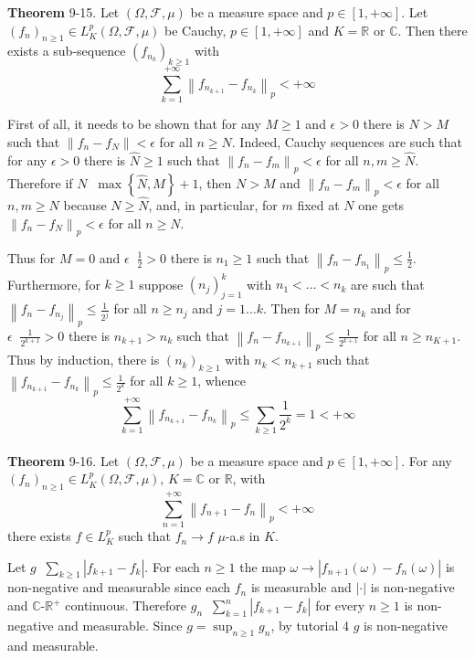 \documentclass[a4paper]{article}
\newcommand{\obj}[1]{\left\{ #1 \right \}}
\newcommand{\clo}[1]{\left [ #1 \right ]}
\newcommand{\brac}[1]{\left ( #1 \right )}
\newcommand{\abs}[1]{\left | #1 \right |}
\newcommand{\nrm}[1]{\left\| #1 \right \|}
\newcommand{\Real}{\mathbb{R}}
\newcommand{\Cplx}{\mathbb{C}}
\newcommand{\Fcal}{\mathcal{F}}
\newcommand{\defn}{\mathop{\overset{\Delta}{=}}\nolimits}
\begin{document}
\label{thm:cauchy_sum} \noindent \textbf{Theorem} 9-15.
Let $\brac{\Omega, \Fcal, \mu}$ be a measure space and $p\in \clo{1,+\infty}$. Let $\brac{f_n}_{n\geq 1} \in L^p_K\brac{\Omega, \Fcal, \mu}$ be Cauchy, $p\in \clo{1,+\infty}$ and $K=\Real$ or $\Cplx$. Then there exists a sub-sequence $\brac{f_{n_k}}_{k\geq 1}$ with \[\sum_{k=1}^{+\infty} \nrm{f_{n_{k+1}}-f_{n_k}}_p < +\infty\]

First of all, it needs to be shown that for any $M\geq 1$ and $\epsilon>0$ there is $N > M$ such that $\nrm{f_n-f_N}<\epsilon$ for all $n\geq N$. Indeed,
Cauchy sequences are such that for any $\epsilon>0$ there is $\hat{N}\geq 1$ such that $\nrm{f_n-f_m}_p<\epsilon$ for all $n,m\geq \hat{N}$. Therefore if $N\defn \max\obj{\hat{N},M}+1$, then $N > M$ and $ \nrm{f_n-f_m}_p<\epsilon$ for all $n,m\geq N$ because $N \geq \hat{N}$, and, in particular, for $m$ fixed at $N$ one gets $\nrm{f_n-f_N}_p<\epsilon$ for all $n\geq N$.

Thus for $M=0$ and $\epsilon\defn \frac{1}{2}>0$ there is $n_1\geq 1$ such that $\nrm{f_n-f_{n_1}}_p \leq \frac{1}{2}$. Furthermore, for $k\geq 1$ suppose $\brac{n_j}_{j=1}^k$ with $n_1<\ldots<n_k$ are such that $\nrm{f_n-f_{n_j}}_p\leq \frac{1}{2^j}$ for all $n\geq n_j$ and $j=1\ldots k$. Then for $M=n_k$ and for $\epsilon\defn \frac{1}{2^{k+1}}>0$ there is $n_{k+1} > n_k$ such that $\nrm{f_n-f_{n_{k+1}}}_p\leq \frac{1}{2^{k+1}}$ for all $n\geq n_{K+1}$. Thus by induction, there is $\brac{n_k}_{k\geq 1}$ with $n_k<n_{k+1}$ such that $\nrm{f_{n_{k+1}}-f_{n_k}}_p\leq \frac{1}{2^k}$ for all $k\geq 1$, whence \[\sum_{k=1}^{+\infty} \nrm{f_{n_{k+1}}-f_{n_k}}_p\leq \sum_{k\geq 1} \frac{1}{2^k} = 1<+\infty\]\\

\label{thm:lp_sum_muas} \noindent \textbf{Theorem} 9-16.
Let $\brac{\Omega, \Fcal, \mu}$ be a measure space and $p\in \clo{1,+\infty}$. For any $\brac{f_n}_{n\geq 1}\in L^p_K\brac{\Omega, \Fcal, \mu}$, $K=\Cplx$ or $\Real$, with\[\sum_{n=1}^{+\infty} \nrm{f_{n+1}-f_n}_p < +\infty\] there exists $f\in L^p_K$ such that $f_n\to f$ $\mu$-a.s in $K$.

Let $g\defn \sum_{k\geq 1} \abs{f_{k+1}-f_k}$. For each $n\geq 1$ the map $\omega\to\abs{f_{n+1}\brac{\omega}-f_n\brac{\omega}}$ is non-negative and measurable since each $f_n$ is measurable and $\abs{\cdot}$ is non-negative and $\Cplx$-$\Real^+$ continuous. Therefore $g_n\defn \sum_{k=1}^n \abs{f_{k+1}-f_k}$ for every $n\geq 1$ is non-negative and measurable. Since $g=\sup_{n\geq 1} g_n$, by tutorial 4 $g$ is non-negative and measurable.
\end{document}
